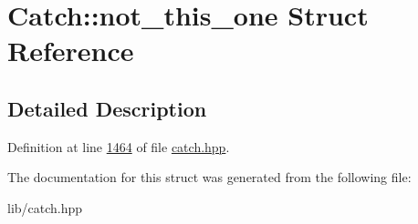 \hypertarget{structCatch_1_1not__this__one}{}\section{Catch\+::not\+\_\+this\+\_\+one Struct Reference}
\label{structCatch_1_1not__this__one}


\subsection{Detailed Description}


Definition at line \mbox{\hyperlink{catch_8hpp_source_l01464}{1464}} of file \mbox{\hyperlink{catch_8hpp_source}{catch.\+hpp}}.



The documentation for this struct was generated from the following file\+:\begin{DoxyCompactItemize}
\item 
lib/catch.\+hpp\end{DoxyCompactItemize}

